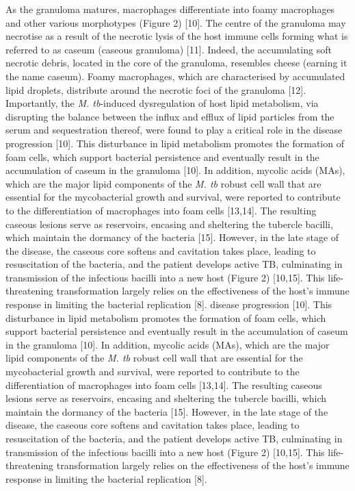 \documentclass{article}
\begin{document}
As the granuloma matures, macrophages differentiate into foamy macrophages and other various morphotypes (Figure 2) [10]. The centre of the granuloma may necrotise as a result of the necrotic lysis of the host immune cells forming what is referred to as caseum (caseous granuloma) [11]. Indeed, the accumulating soft necrotic debris, located in the core of the granuloma, resembles cheese (earning it the name caseum). Foamy macrophages, which are characterised by accumulated lipid droplets, distribute around the necrotic foci of the granuloma [12]. Importantly, the \textit{M. tb}-induced dysregulation of host lipid metabolism, via disrupting the balance between the influx and efflux of lipid particles from the serum and sequestration thereof, were found to play a critical role in the disease progression [10]. This disturbance in lipid metabolism promotes the formation of foam cells, which support bacterial persistence and eventually result in the accumulation of caseum in the granuloma [10]. In addition, mycolic acids (MAs), which are the major lipid components of the \textit{M. tb} robust cell wall that are essential for the mycobacterial growth and survival, were reported to contribute to the differentiation of macrophages into foam cells [13,14]. The resulting caseous lesions serve as reservoirs, encasing and sheltering the tubercle bacilli, which maintain the dormancy of the bacteria [15]. However, in the late stage of the disease, the caseous core softens and cavitation takes place, leading to resuscitation of the bacteria, and the patient develops active TB, culminating in transmission of the infectious bacilli into a new host (Figure 2) [10,15]. This life-threatening transformation largely relies on the effectiveness of the host's immune response in limiting the bacterial replication [8]. disease progression [10]. This disturbance in lipid metabolism promotes the formation of foam cells, which support bacterial persistence and eventually result in the accumulation of caseum in the granuloma [10]. In addition, mycolic acids (MAs), which are the major lipid components of the \textit{M. tb} robust cell wall that are essential for the mycobacterial growth and survival, were reported to contribute to the differentiation of macrophages into foam cells [13,14]. The resulting caseous lesions serve as reservoirs, encasing and sheltering the tubercle bacilli, which maintain the dormancy of the bacteria [15]. However, in the late stage of the disease, the caseous core softens and cavitation takes place, leading to resuscitation of the bacteria, and the patient develops active TB, culminating in transmission of the infectious bacilli into a new host (Figure 2) [10,15]. This life-threatening transformation largely relies on the effectiveness of the host's immune response in limiting the bacterial replication [8].
\end{document}
